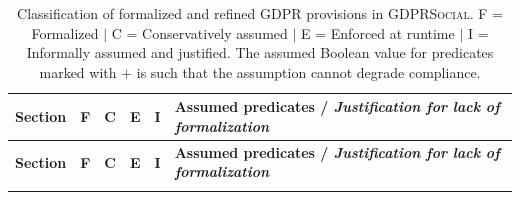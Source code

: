 \iffalse
\begin{longtable}{@{}lccccp{6cm}@{}}
  \caption{Classification of formalized and refined \ac{GDPR} provisions in \textsc{GDPRSocial}.
    F = Formalized $\mid$ C = Conservatively assumed $\mid$ E = Enforced at runtime $\mid$
    I = Informally assumed and justified.
    The assumed Boolean value for predicates marked with $+$ is such that the assumption
    cannot degrade compliance.\label{tab:gdpr:classification}}\\
\toprule
\textbf{Section} & \textbf{F} & \textbf{C} & \textbf{E} & \textbf{I} & \textbf{Assumed predicates / \emph{Justification for lack of formalization}} \\
\midrule
\endfirsthead
\toprule
\textbf{Section} & \textbf{F} & \textbf{C} & \textbf{E} & \textbf{I} & \textbf{Assumed predicates / \emph{Justification for lack of formalization}} \\
\midrule
\endhead
\bottomrule
\endfoot


\end{longtable}
